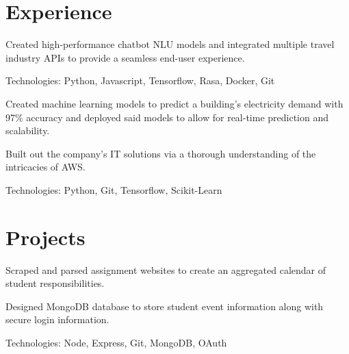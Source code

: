 \documentclass[]{deedy-resume-openfont}
\begin{document}
%
%
\lastupdated

%
%

%
%

\begin{minipage}[t]{0.64\textwidth} 


\section{Experience}
\vspace{\topsep} %
\begin{tightemize}
    \item Created high-performance chatbot NLU models and integrated multiple travel 
    industry APIs to provide a seamless end-user experience.
    \item Technologies: Python, Javascript, Tensorflow, Rasa, Docker, Git
    \end{tightemize}
\sectionsep

\begin{tightemize}
\item Created machine learning models to predict a building's electricity demand with 97\% 
accuracy and deployed said models to allow for real-time prediction and scalability.
\item Built out the company's IT solutions via a thorough understanding of the intricacies of AWS. 
\item Technologies: Python, Git, Tensorflow, Scikit-Learn
\end{tightemize}
\sectionsep

\section{Projects}
\descript{}
\location{}
\begin{tightemize}
    \item Scraped and parsed assignment websites to create an aggregated calendar of
    student responsibilities.
    \item Designed MongoDB database to store student event information along with secure
    login information. 
    \item Technologies: Node, Express, Git, MongoDB, OAuth
\end{tightemize}
\sectionsep


\end{minipage}
\end{document}
